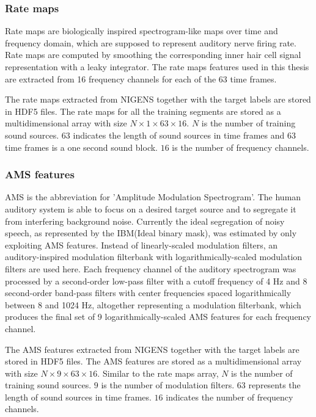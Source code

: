 \subsubsection*{Rate maps}
Rate maps are biologically inspired spectrogram-like maps over time and frequency domain, which are supposed to represent auditory nerve firing rate. Rate maps are computed by smoothing the corresponding inner hair cell signal representation with a leaky integrator. The rate maps features used in this thesis are extracted from 16 frequency channels for each of the 63 time frames. 

The rate maps extracted from NIGENS together with the target labels are stored in HDF5 files. The rate maps for all the training segments are stored as a multidimensional array with size  $N\times 1\times 63\times 16$. $N$ is the number of training sound sources. $63$ indicates the length of sound sources in time frames and $63$ time frames is a one second sound block.  $16$ is the number of frequency channels.

\subsubsection*{AMS features}
AMS is the abbreviation for 'Amplitude Modulation Spectrogram'.  The human auditory system is able to focus
on a desired target source and to segregate it from interfering background noise.
Currently the ideal segregation of noisy speech, as represented by the IBM(Ideal binary mask), was estimated by only exploiting AMS features\cite{may2014computational}. Instead of linearly-scaled modulation filters, an auditory-inspired modulation filterbank with logarithmically-scaled modulation filters are used here.
 Each frequency channel of the auditory spectrogram was processed by a second-order low-pass filter with a cutoff frequency of 4 Hz and 8 second-order band-pass filters with center frequencies spaced logarithmically between 8 and 1024 Hz, altogether representing a
modulation filterbank, which produces the final set of 9 logarithmically-scaled AMS features for each frequency channel\cite{twoearsprojectdoc}.

The AMS features extracted from NIGENS together with the target labels are stored in HDF5 files. The AMS features are stored as a multidimensional array with size  $N\times 9\times 63\times 16$. Similar to the rate maps array, $N$ is the number of training sound sources. $9$ is the number of modulation filters. $63$ represents the length of sound sources in time frames. $16$ indicates the number of frequency channels.

